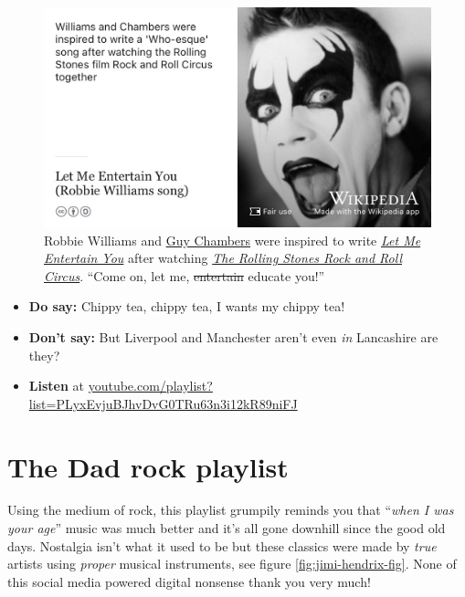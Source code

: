 \documentclass[
]{book}
\providecommand{\tightlist}{%
  \setlength{\itemsep}{0pt}\setlength{\parskip}{0pt}}
\begin{document}
\begin{figure}
\includegraphics[width=0.99\linewidth]{images/let-me-entertain-you-let-me-educate-you} \caption{Robbie Williams and \href{https://en.wikipedia.org/wiki/Guy_Chambers}{Guy Chambers} were inspired to write \emph{\href{https://en.wikipedia.org/wiki/Let_Me_Entertain_You_(Robbie_Williams_song)}{Let Me Entertain You}} after watching \emph{\href{https://en.wikipedia.org/wiki/The_Rolling_Stones_Rock_and_Roll_Circus}{The Rolling Stones Rock and Roll Circus}}. ``Come on, let me, \sout{entertain} educate you!'' \citep{entertainyou}}\label{fig:robbie-williams-fig}
\end{figure}



\begin{itemize}
\tightlist
\item
  \textbf{Do say:} Chippy tea, chippy tea, I wants my chippy tea! \citep{chippytea}
\item
  \textbf{Don't say:} But Liverpool and Manchester aren't even \emph{in} Lancashire are they? \citep{mancashire}
\item
  \textbf{Listen} at \href{https://youtube.com/playlist?list=PLyxEvjuBJhvDvG0TRu63n3i12kR89niFJ}{youtube.com/playlist?list=PLyxEvjuBJhvDvG0TRu63n3i12kR89niFJ}
\end{itemize}

\hypertarget{dadrock}{%
\section{The Dad rock playlist}\label{dadrock}}

Using the medium of rock, this playlist grumpily reminds you that ``\emph{when I was your age}'' music was much better and it's all gone downhill since the good old days. Nostalgia isn't what it used to be but these classics were made by \emph{true} artists using \emph{proper} musical instruments, see figure \ref{fig:jimi-hendrix-fig}. None of this social media powered digital nonsense thank you very much! \citep{lanier}
\end{document}
